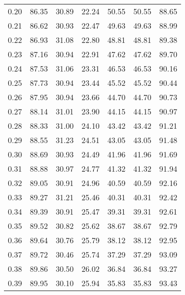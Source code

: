 \begin{tabular}{|c|c|c|c|c|c|c|}
      0.20 &     86.35 &     30.89 &      22.24 &   50.55 &      50.55 &         88.65 \\
      0.21 &     86.62 &     30.93 &      22.47 &   49.63 &      49.63 &         88.99 \\
      0.22 &     86.93 &     31.08 &      22.80 &   48.81 &      48.81 &         89.38 \\
      0.23 &     87.16 &     30.94 &      22.91 &   47.62 &      47.62 &         89.70 \\
      0.24 &     87.53 &     31.06 &      23.31 &   46.53 &      46.53 &         90.16 \\
      0.25 &     87.73 &     30.94 &      23.44 &   45.52 &      45.52 &         90.44 \\
      0.26 &     87.95 &     30.94 &      23.66 &   44.70 &      44.70 &         90.73 \\
      0.27 &     88.14 &     31.01 &      23.90 &   44.15 &      44.15 &         90.97 \\
      0.28 &     88.33 &     31.00 &      24.10 &   43.42 &      43.42 &         91.21 \\
      0.29 &     88.55 &     31.23 &      24.51 &   43.05 &      43.05 &         91.48 \\
      0.30 &     88.69 &     30.93 &      24.49 &   41.96 &      41.96 &         91.69 \\
      0.31 &     88.88 &     30.97 &      24.77 &   41.32 &      41.32 &         91.94 \\
      0.32 &     89.05 &     30.91 &      24.96 &   40.59 &      40.59 &         92.16 \\
      0.33 &     89.27 &     31.21 &      25.46 &   40.31 &      40.31 &         92.42 \\
      0.34 &     89.39 &     30.91 &      25.47 &   39.31 &      39.31 &         92.61 \\
      0.35 &     89.52 &     30.82 &      25.62 &   38.67 &      38.67 &         92.79 \\
      0.36 &     89.64 &     30.76 &      25.79 &   38.12 &      38.12 &         92.95 \\
      0.37 &     89.72 &     30.46 &      25.74 &   37.29 &      37.29 &         93.09 \\
      0.38 &     89.86 &     30.50 &      26.02 &   36.84 &      36.84 &         93.27 \\
      0.39 &     89.95 &     30.10 &      25.94 &   35.83 &      35.83 &         93.43 \\

\end{tabular}
